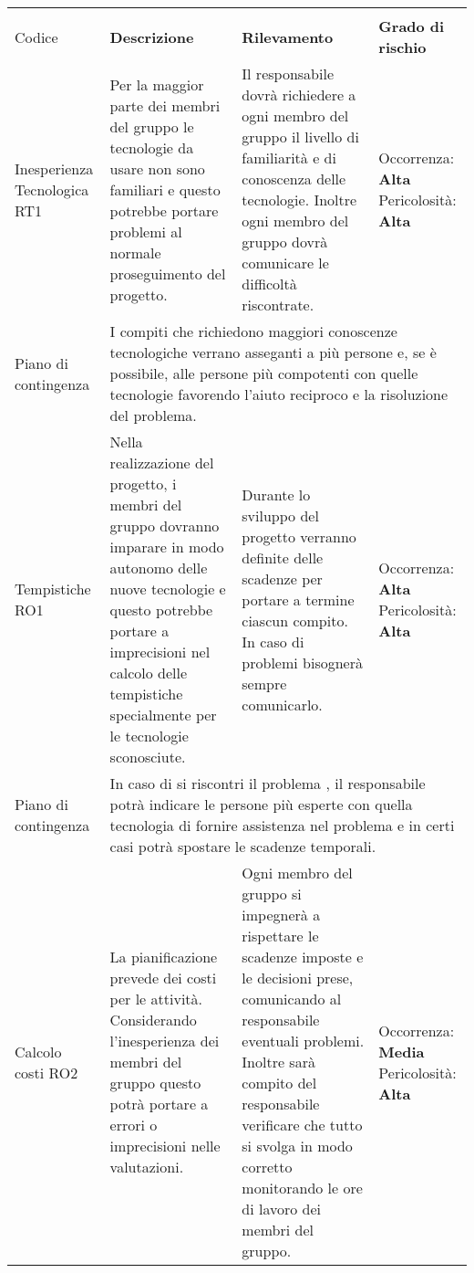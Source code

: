 \begin{center}
		\begin{longtable}{|p{}|p{}|p{}|p{}|}
			\hline
			\rowcolor{lighter-grayer}
			\centering\textbf{Nome \\ Codice} & \centering\textbf{Descrizione} & \centering\textbf{Rilevamento} & \textbf{Grado di rischio} \\
			\hline
			\endfirsthead
		
		\hline
		\centering Inesperienza Tecnologica RT1& Per la maggior parte dei membri del gruppo le tecnologie da usare non sono familiari e questo potrebbe portare problemi al normale proseguimento del progetto.  & Il responsabile dovrà richiedere a ogni membro del gruppo il livello di familiarità e di conoscenza delle tecnologie. Inoltre ogni membro del gruppo dovrà comunicare le difficoltà riscontrate. & Occorrenza: \textbf{Alta} Pericolosità: \textbf{Alta} \\
		\hline
		\centering Piano di contingenza & \multicolumn{3}{p{0.84\textwidth}}{I compiti che richiedono maggiori conoscenze tecnologiche verrano asseganti a più persone e, se è possibile, alle persone più compotenti con quelle tecnologie favorendo l'aiuto reciproco e la risoluzione del problema.} \\
		\hline
		\centering Tempistiche RO1& Nella realizzazione del progetto, i membri del gruppo dovranno imparare in modo autonomo delle nuove tecnologie e questo potrebbe portare a imprecisioni nel calcolo delle tempistiche specialmente per le tecnologie sconosciute. & Durante lo sviluppo del progetto verranno definite delle scadenze per portare a termine ciascun compito. In caso di problemi bisognerà sempre comunicarlo. & Occorrenza: \textbf{Alta} Pericolosità: \textbf{Alta} \\
		\hline
		\centering Piano di contingenza & \multicolumn{3}{p{0.84\textwidth}}{In caso di si riscontri il problema , il responsabile potrà indicare le persone più esperte con quella tecnologia di fornire assistenza nel problema e in certi casi potrà spostare le scadenze temporali.} \\
		\hline
		\centering Calcolo costi RO2& La pianificazione prevede dei costi per le attività. Considerando l'inesperienza dei membri del gruppo questo potrà portare a errori o imprecisioni nelle valutazioni. & Ogni membro del gruppo si impegnerà a rispettare le scadenze imposte e le decisioni prese, comunicando al responsabile eventuali problemi. Inoltre sarà compito del responsabile verificare che tutto si svolga in modo corretto monitorando le ore di lavoro dei membri del gruppo. & Occorrenza: \textbf{Media} Pericolosità: \textbf{Alta}\\

\end{longtable}
\end{center}
